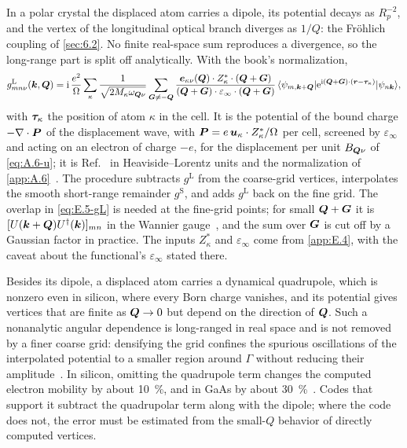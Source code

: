 In a polar crystal the displaced atom carries a dipole, its potential decays as $R_p^{-2}$, and the vertex of the longitudinal optical branch diverges as $1/Q$: the Fr\"ohlich coupling of \cref{sec:6.2}. No finite real-space sum reproduces a divergence, so the long-range part is split off analytically. With the book's normalization,
\begin{equation}
  g^{\mathrm{L}}_{mn\nu}(\bm{k},\bm{Q}) = \mathrm{i}\,\frac{e^2}{\Omega}\sum_\kappa\frac{1}{\sqrt{2M_\kappa\omega_{\bm{Q}\nu}}}
  \sum_{\bm{G}\ne-\bm{Q}}\frac{\bm{e}_{\kappa\nu}(\bm{Q})\cdot Z^*_\kappa\cdot(\bm{Q}+\bm{G})}{(\bm{Q}+\bm{G})\cdot\varepsilon_\infty\cdot(\bm{Q}+\bm{G})}\,
  \langle\psi_{m,\bm{k}+\bm{Q}}|\mathrm{e}^{\mathrm{i}(\bm{Q}+\bm{G})\cdot(\bm{r}-\bm{\tau}_\kappa)}|\psi_{n\bm{k}}\rangle ,
  \label{eq:E.5-gL}
\end{equation}
with $\bm{\tau}_\kappa$ the position of atom $\kappa$ in the cell. It is the potential of the bound charge $-\nabla\cdot\bm{P}$ of the displacement wave, with $\bm{P} = e\,\bm{u}_\kappa\cdot Z^*_\kappa/\Omega$ per cell, screened by $\varepsilon_\infty$ and acting on an electron of charge $-e$, for the displacement per unit $B_{\bm{Q}\nu}$ of \cref{eq:A.6-u}; it is Ref.~\cite[Eq.~(180)]{giustino2017electron} in Heaviside--Lorentz units and the normalization of \cref{app:A.6}~\cite{verdi2015frohlich}. The procedure subtracts $g^{\mathrm{L}}$ from the coarse-grid vertices, interpolates the smooth short-range remainder $g^{\mathrm{S}}$, and adds $g^{\mathrm{L}}$ back on the fine grid. The overlap in \cref{eq:E.5-gL} is needed at the fine-grid points; for small $\bm{Q}+\bm{G}$ it is $[U(\bm{k}+\bm{Q})U^\dagger(\bm{k})]_{mn}$ in the Wannier gauge~\cite[Sect.~VI.A.3]{giustino2017electron}, and the sum over $\bm{G}$ is cut off by a Gaussian factor in practice. The inputs $Z^*_\kappa$ and $\varepsilon_\infty$ come from \cref{app:E.4}, with the caveat about the functional's $\varepsilon_\infty$ stated there.

Besides its dipole, a displaced atom carries a dynamical quadrupole, which is nonzero even in silicon, where every Born charge vanishes, and its potential gives vertices that are finite as $\bm{Q}\to 0$ but depend on the direction of $\bm{Q}$. Such a nonanalytic angular dependence is long-ranged in real space and is not removed by a finer coarse grid: densifying the grid confines the spurious oscillations of the interpolated potential to a smaller region around $\Gamma$ without reducing their amplitude~\cite{brunin2020electron}. In silicon, omitting the quadrupole term changes the computed electron mobility by about \SI{10}{\percent}, and in GaAs by about \SI{30}{\percent}~\cite{brunin2020electron}. Codes that support it subtract the quadrupolar term along with the dipole; where the code does not, the error must be estimated from the small-$Q$ behavior of directly computed vertices.

